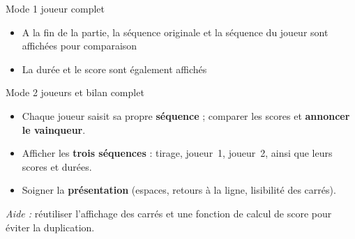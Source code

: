 \begin{UPSTICahierDesCharges}{Mode 1 joueur complet}
\begin{itemize}
  \item A la fin de la partie, la séquence originale et la séquence du joueur sont affichées pour comparaison
  \item La durée et le score sont également affichés
\end{itemize}
\end{UPSTICahierDesCharges}

\begin{UPSTICahierDesCharges}{Mode 2 joueurs et bilan complet}
\begin{itemize}
  \item Chaque joueur saisit sa propre \textbf{séquence} ; comparer les scores et \textbf{annoncer le vainqueur}.
  \item Afficher les \textbf{trois séquences} : tirage, joueur~1, joueur~2, ainsi que leurs scores et durées.
  \item Soigner la \textbf{présentation} (espaces, retours à la ligne, lisibilité des carrés).
\end{itemize}
\textit{Aide :} réutiliser l’affichage des carrés et une fonction de calcul de score pour éviter la duplication.
\end{UPSTICahierDesCharges}

